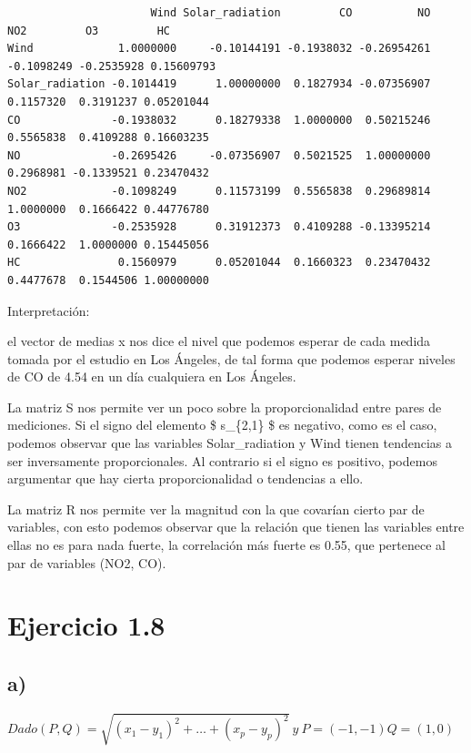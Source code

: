 \documentclass[
]{article}
\begin{document}
\begin{verbatim}
                      Wind Solar_radiation         CO          NO        NO2         O3         HC
Wind             1.0000000     -0.10144191 -0.1938032 -0.26954261 -0.1098249 -0.2535928 0.15609793
Solar_radiation -0.1014419      1.00000000  0.1827934 -0.07356907  0.1157320  0.3191237 0.05201044
CO              -0.1938032      0.18279338  1.0000000  0.50215246  0.5565838  0.4109288 0.16603235
NO              -0.2695426     -0.07356907  0.5021525  1.00000000  0.2968981 -0.1339521 0.23470432
NO2             -0.1098249      0.11573199  0.5565838  0.29689814  1.0000000  0.1666422 0.44776780
O3              -0.2535928      0.31912373  0.4109288 -0.13395214  0.1666422  1.0000000 0.15445056
HC               0.1560979      0.05201044  0.1660323  0.23470432  0.4477678  0.1544506 1.00000000
\end{verbatim}

Interpretación:

el vector de medias x nos dice el nivel que podemos esperar de cada
medida tomada por el estudio en Los Ángeles, de tal forma que podemos
esperar niveles de CO de 4.54 en un día cualquiera en Los Ángeles.

La matriz S nos permite ver un poco sobre la proporcionalidad entre
pares de mediciones. Si el signo del elemento \$ s\_\{2,1\} \$ es
negativo, como es el caso, podemos observar que las variables
Solar\_radiation y Wind tienen tendencias a ser inversamente
proporcionales. Al contrario si el signo es positivo, podemos argumentar
que hay cierta proporcionalidad o tendencias a ello.

La matriz R nos permite ver la magnitud con la que covarían cierto par
de variables, con esto podemos observar que la relación que tienen las
variables entre ellas no es para nada fuerte, la correlación más fuerte
es 0.55, que pertenece al par de variables (NO2, CO).

\hypertarget{ejercicio-1.8}{%
\section{Ejercicio 1.8}\label{ejercicio-1.8}}

\hypertarget{a-3}{%
\subsection{a)}\label{a-3}}

\(Dado\left(P,Q\right)=\sqrt{\left(x_1-y_1\right)^2+\ldots+\left(x_p-y_p\right)^2}\ y\ P=\left(-1,-1\right)Q=\left(1,0\right)\)
\end{document}
